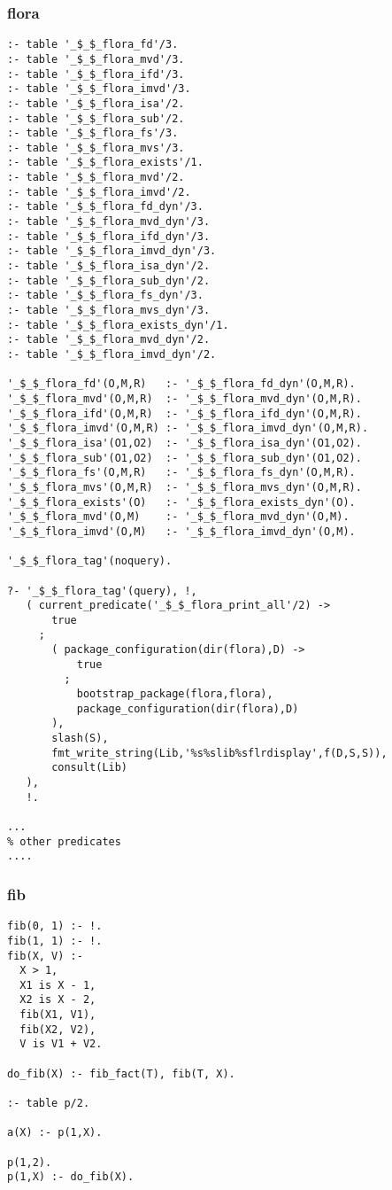 \subsubsection*{flora}

\begin{Verbatim}
:- table '_$_$_flora_fd'/3.
:- table '_$_$_flora_mvd'/3.
:- table '_$_$_flora_ifd'/3.
:- table '_$_$_flora_imvd'/3.
:- table '_$_$_flora_isa'/2.
:- table '_$_$_flora_sub'/2.
:- table '_$_$_flora_fs'/3.
:- table '_$_$_flora_mvs'/3.
:- table '_$_$_flora_exists'/1.
:- table '_$_$_flora_mvd'/2.
:- table '_$_$_flora_imvd'/2.
:- table '_$_$_flora_fd_dyn'/3.
:- table '_$_$_flora_mvd_dyn'/3.
:- table '_$_$_flora_ifd_dyn'/3.
:- table '_$_$_flora_imvd_dyn'/3.
:- table '_$_$_flora_isa_dyn'/2.
:- table '_$_$_flora_sub_dyn'/2.
:- table '_$_$_flora_fs_dyn'/3.
:- table '_$_$_flora_mvs_dyn'/3.
:- table '_$_$_flora_exists_dyn'/1.
:- table '_$_$_flora_mvd_dyn'/2.
:- table '_$_$_flora_imvd_dyn'/2.

'_$_$_flora_fd'(O,M,R)   :- '_$_$_flora_fd_dyn'(O,M,R).
'_$_$_flora_mvd'(O,M,R)  :- '_$_$_flora_mvd_dyn'(O,M,R).
'_$_$_flora_ifd'(O,M,R)  :- '_$_$_flora_ifd_dyn'(O,M,R).
'_$_$_flora_imvd'(O,M,R) :- '_$_$_flora_imvd_dyn'(O,M,R).
'_$_$_flora_isa'(O1,O2)  :- '_$_$_flora_isa_dyn'(O1,O2).
'_$_$_flora_sub'(O1,O2)  :- '_$_$_flora_sub_dyn'(O1,O2).
'_$_$_flora_fs'(O,M,R)   :- '_$_$_flora_fs_dyn'(O,M,R).
'_$_$_flora_mvs'(O,M,R)  :- '_$_$_flora_mvs_dyn'(O,M,R).
'_$_$_flora_exists'(O)   :- '_$_$_flora_exists_dyn'(O).
'_$_$_flora_mvd'(O,M)    :- '_$_$_flora_mvd_dyn'(O,M).
'_$_$_flora_imvd'(O,M)   :- '_$_$_flora_imvd_dyn'(O,M).

'_$_$_flora_tag'(noquery).

?- '_$_$_flora_tag'(query), !,
   ( current_predicate('_$_$_flora_print_all'/2) ->
       true
     ;
       ( package_configuration(dir(flora),D) ->
           true
         ;
           bootstrap_package(flora,flora),
           package_configuration(dir(flora),D)
       ),
       slash(S),
       fmt_write_string(Lib,'%s%slib%sflrdisplay',f(D,S,S)),
       consult(Lib)
   ),
   !.

...
% other predicates
....
\end{Verbatim}

\subsubsection*{fib}

\begin{Verbatim}
fib(0, 1) :- !.
fib(1, 1) :- !.
fib(X, V) :-
  X > 1,
  X1 is X - 1,
  X2 is X - 2,
  fib(X1, V1),
  fib(X2, V2),
  V is V1 + V2.
     
do_fib(X) :- fib_fact(T), fib(T, X).

:- table p/2.

a(X) :- p(1,X).

p(1,2).
p(1,X) :- do_fib(X).
\end{Verbatim}

